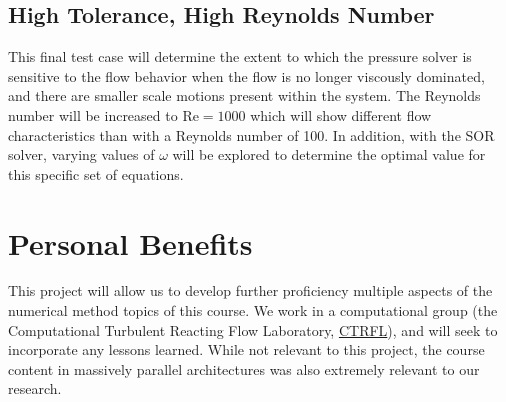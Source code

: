 \documentclass{homework}
\begin{document}
\subsection{High Tolerance, High Reynolds Number}
This final test case will determine the extent to which the pressure solver is sensitive to the flow behavior when the flow is no longer viscously dominated, and there are smaller scale motions present within the system. The Reynolds number will be increased to $\textrm{Re} = 1000$ which will show different flow characteristics than with a Reynolds number of 100. In addition, with the SOR solver, varying values of $\omega$ will be explored to determine the optimal value for this specific set of equations.

\section{\textbf{Personal Benefits}}
\noindent This project will allow us to develop further proficiency multiple aspects of the numerical method topics of this course. We work in a computational group (the Computational Turbulent Reacting Flow Laboratory, \href{https://ctrfl.princeton.edu/}{CTRFL}), and will seek to incorporate any lessons learned. While not relevant to this project, the course content in massively parallel architectures was also extremely relevant to our research.



\end{document}
